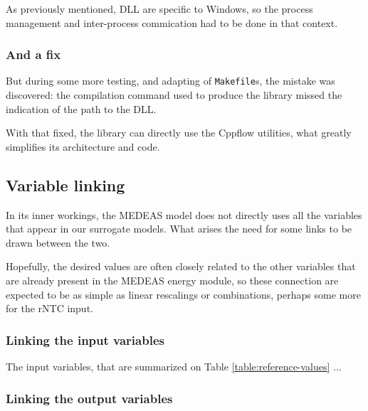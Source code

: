 As previously mentioned, DLL are specific to Windows, so the process management and inter-process commication had to be done in that context.

\subsubsection{And a fix}

But during some more testing, and adapting of \texttt{Makefile}s, the mistake was discovered: the compilation command used to produce the library missed the indication of the path to the DLL.

With that fixed, the library can directly use the Cppflow utilities, what greatly simplifies its architecture and code.

\subsection{Variable linking}

In its inner workings, the MEDEAS model does not directly uses all the variables that appear in our surrogate models. What arises the need for some links to be drawn between the two.

Hopefully, the desired values are often closely related to the other variables that are already present in the MEDEAS energy module, so these connection are expected to be as simple as linear rescalings or combinations, perhaps some more for the rNTC input.

\subsubsection{Linking the input variables}

The input variables, that are summarized on Table \ref{table:reference-values} ...

\subsubsection{Linking the output variables}